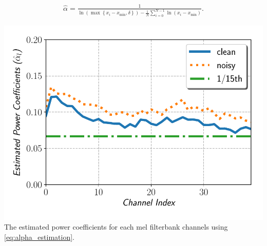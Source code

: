 \documentclass[a0,portrait]{a0poster}
\newenvironment{Figure}
  {\par\medskip\noindent\minipage{\linewidth}}
  {\endminipage\par\medskip}
\begin{document}
\begin{multicols}{2}
\begin{itemize}
\begin{align}
  \hat{\alpha} = \frac{1}{
    \ln \left(\max \left\{x_i - x_{\text{min}}, \delta \right\} \right)
    - \frac{1}{N} \sum_{i=0}^{N-1} \ln \left(x_i - x_{\text{min}}\right)}.
  \label{eq:alpha_estimation}
\end{align}
%
%
\end{itemize}
%
%
  \begin{Figure}
    \begin{center}
      \includegraphics[width=170mm]{estimated_power_coeff}
       {
        \label{fig:estimated_power_coeff}
        The estimated power coefficients for each mel filterbank channels using
        \eqref{eq:alpha_estimation}.
      }
    \end{center}
    \vspace{-7mm}
  \end{Figure}
%
%
%

\end{multicols}
\end{document}
